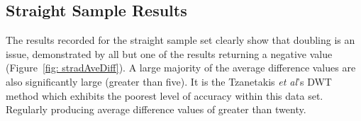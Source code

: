 \documentclass[a4paper, 11pt]{article}
\begin{document}







\subsection{Straight Sample Results}
The results recorded for the straight sample set clearly show that doubling is an issue, demonstrated by all but one of the results returning a negative value (Figure~\ref{fig: stradAveDiff}). A large majority of the average difference values are also significantly large (greater than five). It is the Tzanetakis \textit{et al}'s \cite{tzane1} DWT method which exhibits the poorest level of accuracy within this data set. Regularly producing average difference values of greater than twenty.\par
\end{document}
